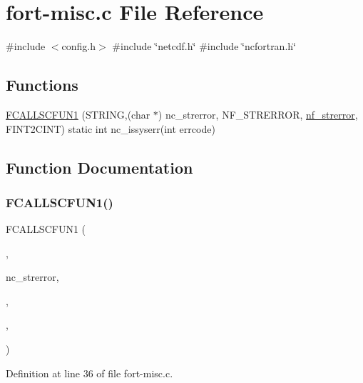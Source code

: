 \hypertarget{fort-misc_8c}{}\section{fort-\/misc.c File Reference}
\label{fort-misc_8c}
{\ttfamily \#include $<$config.\+h$>$}\newline
{\ttfamily \#include \char`\"{}netcdf.\+h\char`\"{}}\newline
{\ttfamily \#include \char`\"{}ncfortran.\+h\char`\"{}}\newline
\subsection*{Functions}
\begin{DoxyCompactItemize}
\item 
\hyperlink{fort-misc_8c_a1971c75ae735819fe60c9474b51f50fa}{F\+C\+A\+L\+L\+S\+C\+F\+U\+N1} (S\+T\+R\+I\+NG,(char $\ast$) nc\+\_\+strerror, N\+F\+\_\+\+S\+T\+R\+E\+R\+R\+OR, \hyperlink{nf__misc_8f90_a5dc92cfb84f35ead3ef8cb519ee515e6}{nf\+\_\+strerror}, F\+I\+N\+T2\+C\+I\+NT) static int nc\+\_\+issyserr(int errcode)
\end{DoxyCompactItemize}


\subsection{Function Documentation}
\mbox{\label{fort-misc_8c_a1971c75ae735819fe60c9474b51f50fa}} 
\subsubsection{\texorpdfstring{F\+C\+A\+L\+L\+S\+C\+F\+U\+N1()}{FCALLSCFUN1()}}
{\footnotesize\ttfamily F\+C\+A\+L\+L\+S\+C\+F\+U\+N1 (\begin{DoxyParamCaption}\item[{S\+T\+R\+I\+NG}]{,  }\item[{(char $\ast$)}]{nc\+\_\+strerror,  }\item[{N\+F\+\_\+\+S\+T\+R\+E\+R\+R\+OR}]{,  }\item[{\hyperlink{nf__misc_8f90_a5dc92cfb84f35ead3ef8cb519ee515e6}{nf\+\_\+strerror}}]{,  }\item[{F\+I\+N\+T2\+C\+I\+NT}]{ }\end{DoxyParamCaption})}



Definition at line 36 of file fort-\/misc.\+c.

